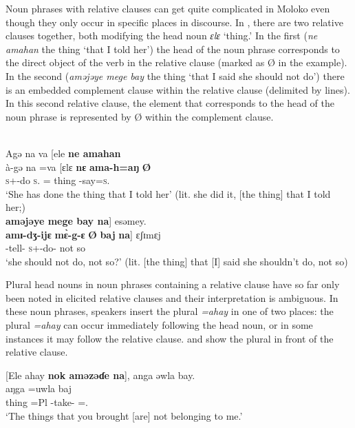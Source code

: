 Noun phrases with relative clauses can get quite complicated in Moloko even though they only occur in specific places in discourse. In , there are two relative clauses together, both modifying the head noun \textit{ɛlɛ} ‘thing.’ In the first (\textit{ne amahan}  the thing ‘that I told her’) the head of the noun phrase corresponds to the direct object of the verb in the relative clause (marked as Ø in the example). In the second (\textit{aməjəye mege bay} the thing ‘that I said she should not do’) there is an embedded complement clause within the relative clause (delimited by lines). In this second relative clause, the element that corresponds to the head of the noun phrase is represented by Ø within the complement clause.


\ea \label{ex:5:109}\\
Agə na  va  [ele  \textbf{ne    amahan} \\
\gll  à-gə  na  =va    [ɛlɛ     \textbf{nɛ} \textbf{ama-h=aŋ}   \textbf{Ø}\\
      \textsc{s}+{\PFV}-do     \textsc{s}.{\DO}   ={\PRF}   thing   {\oneS}     {\DEP}-say=\textsc{s}.{\IO}  { }\\
\glt ‘She has done the thing that I told her’ (lit. she did it, [the thing] that I told her;)\\
      
\medskip
\textbf{aməjəye  {\textbar}mege  bay{\textbar}  na}]  esəmey.\\
\gll  \textbf{amɪ-dʒ-ijɛ} {\textbar}\textbf{m\`{ɛ}-g-ɛ} \textbf{Ø} \textbf{baj}{\textbar} \textbf{na}] ɛʃɪmɛj\\
      {\DEP}-tell-{\CL}    \textsc{s}+{\HOR}-do-{\CL} { } {\NEG}    {\PSP}    {not so}\\
\glt  ‘she should not do, not so?’ (lit. [the thing] that [I] said she shouldn’t do, not so)
\z

Plural head nouns in noun phrases containing a relative clause have so far only been noted in elicited relative clauses and their interpretation is ambiguous. In these noun phrases, speakers insert the plural \textit{=ahay}  in one of two places: the plural \textit{=ahay} can occur immediately following the head noun, or in some instances it may follow the relative clause.  and  show the plural in front of the relative clause. 

\ea \label{ex:5:110}
{}[Ele  ahay  \textbf{nok  aməzəɗe  na}],  anga  əwla  bay.\\
\gll  [ɛlɛ     =ahaj  \textbf{nɔkʷ} \textbf{amɪ-ʒɪɗ-ɛ}   \textbf{na}]  aŋga  =uwla    baj\\
      thing  =Pl  {\twoS}  {\DEP}-take-{\CL}  {\PSP}  {\POSS}  ={\oneS}.{\POSS}  {\NEG}\\
\glt  ‘The things that you brought [are] not belonging to me.’
\z

